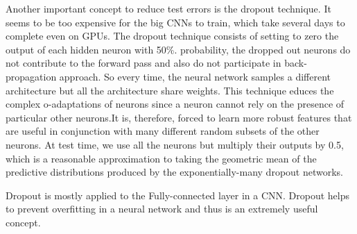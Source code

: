 Another important concept to reduce test errors is the dropout technique. It seems to be too expensive for the big CNNs to train, which take several days to complete even on GPUs. The dropout technique consists of setting to zero the output of each hidden neuron with 50{\%}. probability, the dropped out neurons do not contribute to the forward pass and also do not participate in back-propagation approach. So every time, the neural network samples a different architecture but all the architecture share weights. This technique educes the complex o-adaptations of neurons since a neuron cannot rely on the presence of particular other neurons.It is, therefore, forced to learn more robust features that are useful in conjunction with many different random subsets of the other neurons. At test time, we use all the neurons but multiply their outputs by 0.5, which is a reasonable approximation to taking the geometric mean of the predictive distributions produced by the exponentially-many dropout networks.

Dropout\cite{dropout} is mostly applied to the Fully-connected layer in a CNN. Dropout helps to prevent overfitting in a neural network and  thus is an extremely useful concept.



